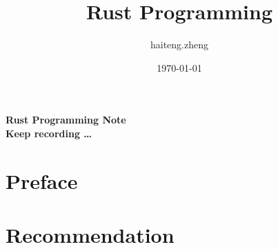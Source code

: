 

\title{Rust Programming}
\author{haiteng.zheng}
\date{\today}
%

\thispagestyle{empty}	%
\begin{center}
	{\Huge\bf Rust Programming Note}\\[5mm]
	{\Large\bf Keep recording \dots }
\end{center}
\cleardoublepage

\frontmatter	%
\chapter*{Preface}
\cleardoublepage

\tableofcontents
\cleardoublepage



\mainmatter		%
%
%
%
 
\appendix
\chapter{Recommendation}

%
%

\newpage
\printglossaries

